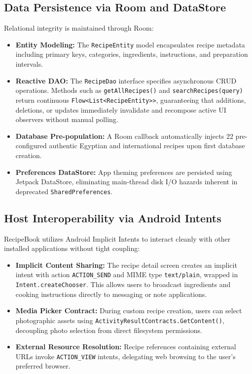 \documentclass[sigconf]{acmart}
\begin{document}
\subsection{Data Persistence via Room and DataStore}
Relational integrity is maintained through Room:
\begin{itemize}
    \item \textbf{Entity Modeling:} The \texttt{RecipeEntity} model encapsulates recipe metadata including primary keys, categories, ingredients, instructions, and preparation intervals.
    \item \textbf{Reactive DAO:} The \texttt{RecipeDao} interface specifies asynchronous CRUD operations. Methods such as \texttt{getAllRecipes()} and \texttt{searchRecipes(query)} return continuous \texttt{Flow<List<RecipeEntity>>}, guaranteeing that additions, deletions, or updates immediately invalidate and recompose active UI observers without manual polling.
    \item \textbf{Database Pre-population:} A Room callback automatically injects 22 pre-configured authentic Egyptian and international recipes upon first database creation.
    \item \textbf{Preferences DataStore:} App theming preferences are persisted using Jetpack DataStore, eliminating main-thread disk I/O hazards inherent in deprecated \texttt{SharedPreferences}.
\end{itemize}

\subsection{Host Interoperability via Android Intents}
RecipeBook utilizes Android Implicit Intents to interact cleanly with other installed applications without tight coupling:
\begin{itemize}
    \item \textbf{Implicit Content Sharing:} The recipe detail screen creates an implicit intent with action \texttt{ACTION\_SEND} and MIME type \texttt{text/plain}, wrapped in \texttt{Intent.createChooser}. This allows users to broadcast ingredients and cooking instructions directly to messaging or note applications.
    \item \textbf{Media Picker Contract:} During custom recipe creation, users can select photographic assets using \texttt{ActivityResultContracts.GetContent()}, decoupling photo selection from direct filesystem permissions.
    \item \textbf{External Resource Resolution:} Recipe references containing external URLs invoke \texttt{ACTION\_VIEW} intents, delegating web browsing to the user's preferred browser.
\end{itemize}
\end{document}
